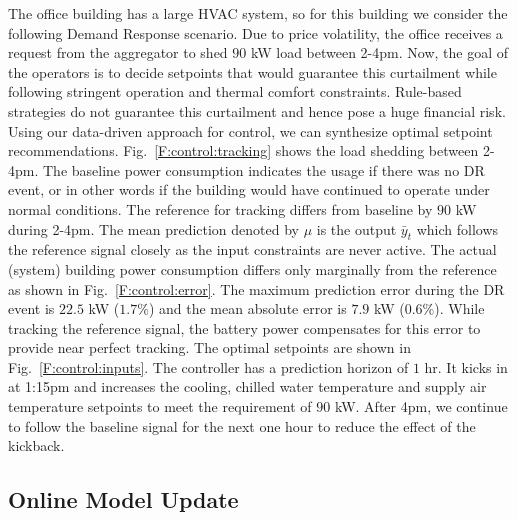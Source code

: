 The office building has a large HVAC system, so for this building we consider the following Demand Response scenario. 
Due to price volatility, the office receives a request from the aggregator to shed \(90\) kW load between 2-4pm. 
Now, the goal of the operators is to decide setpoints that would guarantee this curtailment while following stringent operation and thermal comfort constraints. 
Rule-based strategies do not guarantee this curtailment and hence pose a huge financial risk. 
Using our data-driven approach for control, we can synthesize optimal setpoint recommendations.
Fig.~\ref{F:control:tracking} shows the load shedding between 2-4pm. 
The baseline power consumption indicates the usage if there was no DR event, or in other words if the building would have continued to operate under normal conditions. The reference for tracking differs from baseline by \(90\) kW during 2-4pm.
The mean prediction denoted by \(\mu\) is the output \(\bar{y}_{t}\) which follows the reference signal closely as the input constraints are never active. The actual (system) building power consumption differs only marginally from the reference as shown in Fig.~\ref{F:control:error}. The maximum prediction error during the DR event is \(22.5\) kW (\(1.7\%\)) and the mean absolute error is \(7.9\) kW (\(0.6\%\)). While tracking the reference signal, the battery power compensates for this error to provide near perfect tracking. The optimal setpoints are shown in Fig.~\ref{F:control:inputs}. The controller has a prediction horizon of \(1\) hr. It kicks in at 1:15pm and increases the cooling, chilled water temperature and supply air temperature setpoints to meet the requirement of \(90\) kW. After 4pm, we continue to follow the baseline signal for the next one hour to reduce the effect of the kickback.

\subsection{Online Model Update}
\label{SS:casestudy:active}




